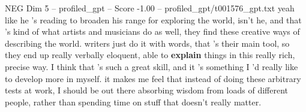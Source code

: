 \begin{textsample}{NEG Dim 5 – profiled\_gpt – Score -1.00 – profiled\_gpt/t001576\_gpt.txt}  \label{ex:f5_neg_024}
yeah like he ’s reading to broaden his range for exploring the world, isn't he, and that ’s kind of what artists and musicians do as well, they find these creative ways of describing the world. writers just do it with words, that ’s their main tool, so they end up really verbally eloquent, able to \textbf{explain} things in this really rich, precise way.
I think that ’s such a great skill, and it ’s something I ’d really like to develop more in myself. it makes me feel that instead of doing these arbitrary tests at work, I should be out there absorbing wisdom from loads of different people, rather than spending time on stuff that doesn't really matter.

\end{textsample}
